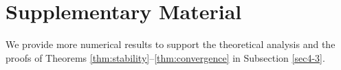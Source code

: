 \documentclass[10pt]{siamltex}
\newcommand{\abs}[1]{\left\vert#1\right\vert}
\begin{document}
\newpage
{}

\setcounter{section}{0}
\setcounter{thm}{0}
\def\thesection{\alph{section}} %
\section{Supplementary Material}
We provide more numerical results to support the theoretical analysis and the proofs of Theorems \ref{thm:stability}--\ref{thm:convergence} in Subsection \ref{sec4-3}.

%

\iffalse
\end{document}
